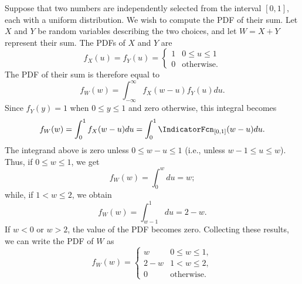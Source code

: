 \begin{example}
Suppose that two numbers are independently selected from the interval $[0,1]$, each with a uniform distribution.
We wish to compute the PDF of their sum.
Let $X$ and $Y$ be random variables describing the two choices, and let $W = X + Y$ represent their sum.
The PDFs of $X$ and $Y$ are
\begin{equation*}
f_X(u) = f_Y(u)
= \begin{cases} 1 & 0 \leq u \leq 1 \\
0 & \text{otherwise} . \end{cases}
\end{equation*}
The PDF of their sum is therefore equal to
\begin{equation*}
f_W(w) = \int_{-\infty}^{\infty} f_X(w - u) f_Y(u) du .
\end{equation*}
Since $f_Y(y) = 1$ when $0 \leq y \leq 1$ and zero otherwise, this integral becomes
\begin{equation*}
f_W (w) = \int_0^1 f_X(w - u) du
= \int_0^1 \IndicatorFcn_{[0,1]}(w - u) du .
\end{equation*}
The integrand above is zero unless $0 \leq w - u \leq 1$ (i.e., unless $w - 1 \leq u \leq w$).
Thus, if $0 \leq w \leq 1$, we get
\begin{equation*}
f_W(w) = \int_0^w du = w ;
\end{equation*}
while, if $1 < w \leq 2$, we obtain
\begin{equation*}
f_W(w) = \int_{w - 1}^1 du = 2 - w .
\end{equation*}
If $w < 0$ or $w > 2$, the value of the PDF becomes zero.
Collecting these results, we can write the PDF of $W$ as
\begin{equation*}
f_W(w) = \begin{cases} w & 0 \leq w \leq 1, \\
2-w & 1 < w \leq 2, \\
0 & \text{otherwise} . \end{cases}
\end{equation*}
\end{example}

